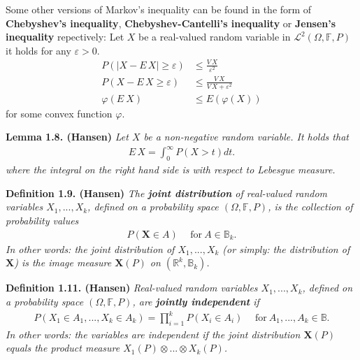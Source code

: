 \documentclass[a4paper,12pt,openany]{book}
\begin{document}
Some other versions of Markov's inequality can be found in the form of \textbf{Chebyshev's inequality}, \textbf{Chebyshev-Cantelli's inequality} or \textbf{Jensen's inequality} repectively: Let \(X\) be a real-valued random variable in \(\mathcal{L}^2(\Omega,\mathbb{F},P)\) it holds for any \(\varepsilon>0\).
\begin{align*}
    P\left(\vert X-E\, X\vert \ge \varepsilon\right)&\le \frac{V\, X}{\varepsilon^2}\tag{1.15}\\
    P\left( X-E\, X \ge \varepsilon\right)&\le \frac{V\, X}{V\, X+\varepsilon^2}\tag{prob: 1.13(c)}\\
    \varphi\left(E\ X\right)&\le E\left( \varphi(X)\right)
\end{align*}
for some convex function \(\varphi\).

\textbf{Lemma 1.8. (Hansen)} \emph{Let \(X\) be a non-negative random variable. It holds that}
\begin{align*}
    E\, X=\int_0^\infty P(X>t)dt.\tag{1.16}
\end{align*}
\emph{where the integral on the right hand side is with respect to Lebesgue measure.}

\textbf{Definition 1.9. (Hansen)} \emph{The \textbf{joint distribution} of real-valued random variables \(X_1,...,X_k\), defined on a probability space \((\Omega, \mathbb{F},P)\), is the collection of probability values}
\begin{align*}
    P(\mathbf{X}\in A)\hspace{15pt}\text{for}\ A\in\mathbb{B}_k.\tag{1.21}
\end{align*}
\emph{In other words: the joint distribution of \(X_1,...,X_k\) (or simply: the distribution of \(\mathbf{X}\)) is the image measure \(\mathbf{X}(P)\) on \(\left(\mathbb{R}^k,\mathbb{B}_k\right)\).}

\textbf{Definition 1.11. (Hansen)} \emph{Real-valued random variables \(X_1,...,X_k\), defined on a probability space \((\Omega, \mathbb{F},P)\), are \textbf{jointly independent} if}
\begin{align*}
    P\left(X_1\in A_1,...,X_k\in A_k\right)=\prod_{i=1}^kP(X_i\in A_i)\hspace{15pt}\text{for}\ A_1,...,A_k\in\mathbb{B}.\tag{1.23}
\end{align*}
\emph{In other words: the variables are independent if the joint distribution \(\mathbf{X}(P)\) equals the product measure \(X_1(P)\otimes ... \otimes X_k(P)\).}
\end{document}
